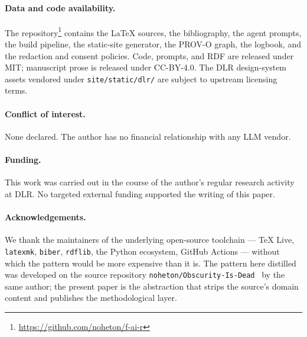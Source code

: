 \paragraph{Data and code availability.}
The repository\footnote{\url{https://github.com/noheton/f-ai-r}}
contains the \LaTeX{} sources, the bibliography, the agent prompts,
the build pipeline, the static-site generator, the PROV-O graph,
the logbook, and the redaction and consent policies. Code, prompts,
and RDF are released under MIT; manuscript prose is released under
CC-BY-4.0. The DLR design-system assets vendored under
\texttt{site/static/dlr/} are subject to upstream licensing terms.

\paragraph{Conflict of interest.}
None declared. The author has no financial relationship with any
LLM vendor.

\paragraph{Funding.}
This work was carried out in the course of the author's regular
research activity at DLR. No targeted external funding supported
the writing of this paper.

\paragraph{Acknowledgements.}
We thank the maintainers of the underlying open-source toolchain
--- TeX Live, \texttt{latexmk}, \texttt{biber}, \texttt{rdflib},
the Python ecosystem, GitHub Actions --- without which the pattern
would be more expensive than it is. The pattern here distilled was
developed on the source repository
\texttt{noheton/Obscurity-Is-Dead}~\cite{krebs2026obscurity} by the
same author; the present paper is the abstraction that strips the
source's domain content and publishes the methodological layer.
